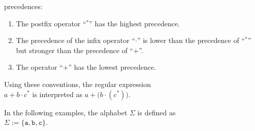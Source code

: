 precedences:
\begin{enumerate}
\item The postfix operator ``$^*$'' has the highest precedence.
\item The precedence of the infix operator ``$\cdot$'' is lower than the precedence of  ``$^*$'' but
      stronger than the precedence of ``$+$''.
\item The operator ``$+$'' has the lowest precedence.
\end{enumerate}
Using these conventions, the regular expression 
\\[0.2cm]
\hspace*{1.3cm}
$a + b \cdot c^*$ \quad is interpreted as  \quad $a + \bigl(b \cdot (c^*)\bigr)$.

\examplesEng
In the following examples, the alphabet  $\Sigma$ is defined as
\\[0.2cm]
\hspace*{1.3cm}
$\Sigma := \{ \texttt{a}, \texttt{b}, \texttt{c} \}$.

